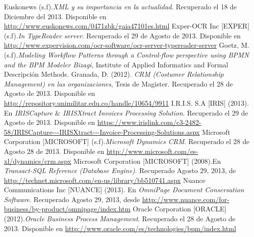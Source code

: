 Euskonews (s.f).\textit{XML y su importancia en la actualidad}. Recuperado el 18 de Diciembre del 2013. Disponible en \url{http://www.euskonews.com/0471zbk/gaia47101es.html}
\newline
\newline
Exper-OCR Inc [EXPER] (s.f).\textit{In TypeReader server}. Recuperado el 29 de Agosto de 2013. Disponible en
\url{http://www.expervision.com/ocr-software/ocr-server-typereader-server}
\newline
\newline
Goetz, M. (s.f).\textit{Modeling Workflow Patterns through a Control-flow perspective using BPMN and the BPM Modeler Bizagi}, Institute of Applied Informatics and Formal Descripción Methods. 
\newline
\newline
Granada, D. (2012).\textit{ CRM (Costumer Relationship Management) en las organizaciones}, Tesis  de Magister. Recuperado el 28 de Agosto de 2013. Disponible en \url{http://repository.unimilitar.edu.co/handle/10654/9911}
\newline
\newline
I.R.I.S. S.A [IRIS] (2013). En \textit{IRISCapture $\&$ IRISXtract Invoices Processing Solution}. Recuperado el 29 de Agosto de 2013. Disponible en \url{https://www.irislink.com/c3-2482-58/IRISCapture---IRISXtract---Invoice-Processing-Solutions.aspx}
\newline
\newline
Microsoft Corporation [MICROSOFT] (s.f).\textit{Microsoft Dynamics CRM}. Recuperado el 28 de  Agosto 28 de 2013. Disponible en \url{http://www.microsoft.com/es-xl/dynamics/crm.aspx}
\newline
\newline
Microsoft Corporation [MICROSOFT] (2008).En \textit{ Transact-SQL Reference (Database Engine)}. Recuperado Agosto 29, 2013, de \url{http://technet.microsoft.com/en-us/library/bb510741.aspx}
\newline
\newline
Nuance Communications Inc [NUANCE] (2013). En\textit{ OmniPage Document Consersation Software}. Recuperado Agosto 29, 2013, desde \url{http://www.nuance.com/for-business/by-product/omnipage/index.htm}
\newline
\newline
Oracle Corporation [ORACLE] (2012).\textit{Oracle Business Process Management}. Recuperado el 28 de Agosto de 2013. Disponible en \url{http://www.oracle.com/es/technologies/bpm/index.html}
\newline
